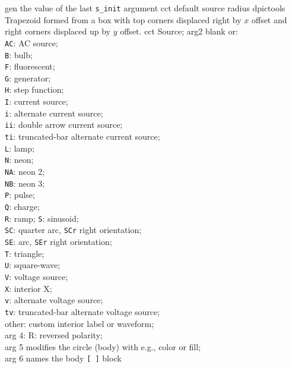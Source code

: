 %
  {gen}%
  {the value of the last {\tt s\_init} argument
    }%
%
  {cct}%
  {default source radius}%
%
  {dpictools}%
  {$\;\;$ Trapezoid formed from a box with top corners displaced right by
    $x$ offset and right corners displaced up by $y$ offset.}%
%
  {cct}%
  {Source; arg2 blank or:\\
               {\tt AC}: AC source;\\
               {\tt B}: bulb;\\
               {\tt F}: fluorescent;\\
               {\tt G}: generator;\\
               {\tt H}: step function;\\
               {\tt I}: current source;\\
               {\tt i}: alternate current source;\\
               {\tt ii}: double arrow current source;\\
               {\tt ti}: truncated-bar alternate current source;\\
               {\tt L}: lamp;\\
               {\tt N}: neon;\\
               {\tt NA}: neon 2;\\
               {\tt NB}: neon 3;\\
               {\tt P}: pulse;\\
               {\tt Q}: charge;\\
               {\tt R}: ramp;
               {\tt S}: sinusoid;\\
               {\tt SC}: quarter arc, {\tt SCr} right orientation;\\
               {\tt SE}: arc, {\tt SEr} right orientation;\\
               {\tt T}: triangle;\\
               {\tt U}: square-wave;\\
               {\tt V}: voltage source;\\
               {\tt X}: interior X;\\
               {\tt v}: alternate voltage source;\\
               {\tt tv}: truncated-bar alternate voltage source;\\
               other: custom interior label or waveform;\\
        arg 4: R: reversed polarity;\\
        arg 5 modifies the circle (body) with e.g., color or fill;\\
        arg 6 names the body {\tt [ ]} block
   }%
